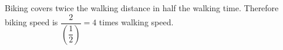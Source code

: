 Biking covers twice the walking distance in half the walking time. Therefore biking speed is $\dfrac{2}{(\dfrac{1}{2})}=\boxed4$ times walking speed.
